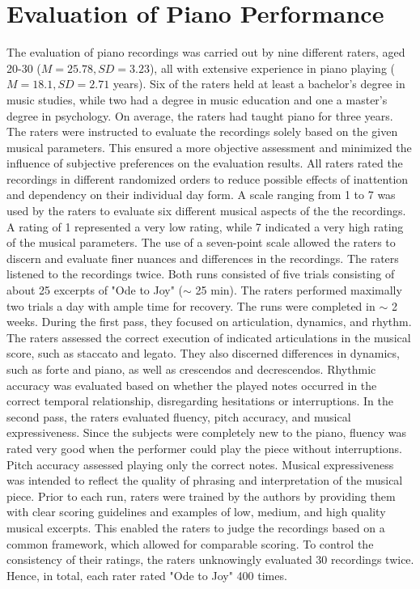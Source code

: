 \section{Evaluation of Piano Performance}
The evaluation of piano recordings was carried out by nine different raters, aged 20-30 ($M=25.78, SD = 3.23$), all with extensive experience in piano playing ($M=18.1, SD = 2.71$ years). Six of the raters held at least a bachelor's degree in music studies, while two had a degree in music education and one a master's degree in psychology. On average, the raters had taught piano for three years. 
The raters were instructed to evaluate the recordings solely based on the given musical parameters. This ensured a more objective assessment and minimized the influence of subjective preferences on the evaluation results. All raters rated the recordings in different randomized orders to reduce possible effects of inattention and dependency on their individual day form.
A scale ranging from 1 to 7 was used by the raters to evaluate six different musical aspects of the the recordings. A rating of 1 represented a very low rating, while 7 indicated a very high rating of the musical parameters. The use of a seven-point scale allowed the raters to discern and evaluate finer nuances and differences in the recordings.
The raters listened to the recordings twice. Both runs consisted of five trials consisting of about 25 excerpts of "Ode to Joy" ($\sim$ 25 min). The raters performed maximally two trials a day with ample time for recovery. The runs were completed in $\sim$ 2 weeks. During the first pass, they focused on articulation, dynamics, and rhythm. The raters assessed the correct execution of indicated articulations in the musical score, such as staccato and legato. They also discerned differences in dynamics, such as forte and piano, as well as crescendos and decrescendos. Rhythmic accuracy was evaluated based on whether the played notes occurred in the correct temporal relationship, disregarding hesitations or interruptions. In the second pass, the raters evaluated fluency, pitch accuracy, and musical expressiveness. Since the subjects were completely new to the piano, fluency was rated very good when the performer could play the piece without interruptions. Pitch accuracy assessed playing only the correct notes. Musical expressiveness was intended to reflect the quality of phrasing and interpretation of the musical piece. 
Prior to each run, raters were trained by the authors by providing them with clear scoring guidelines and examples of low, medium, and high quality musical excerpts. This enabled the raters to judge the recordings based on a common framework, which allowed for comparable scoring. To control the consistency of their ratings, the raters unknowingly evaluated 30 recordings twice. Hence, in total, each rater rated "Ode to Joy" 400 times. 




